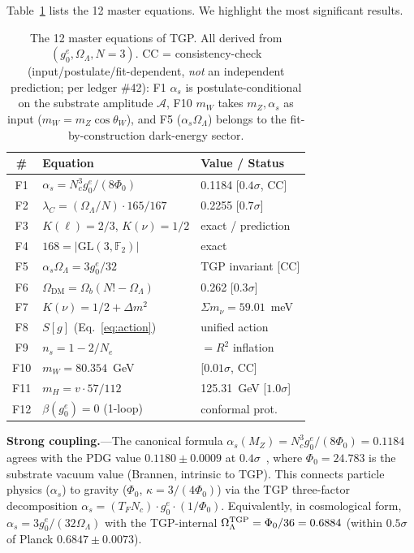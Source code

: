 \documentclass[aps,prl,twocolumn,superscriptaddress,showpacs,floatfix]{revtex4-2}
\newcommand{\gone}{{g_0^e}}
\newcommand{\OL}{\Omega_\Lambda}
\newcommand{\GL}{\mathrm{GL}(3,\mathbb{F}_2)}
\newcommand{\as}{\alpha_s}
\newcommand{\PhiZero}{\Phi_0}
\begin{document}
Table~\ref{tab:master} lists the 12 master equations.
We highlight the most significant results.

\begin{table}[b]
\caption{The 12 master equations of TGP.
  All derived from $(\gone, \OL, N{=}3)$.
  CC = consistency-check (input/postulate/fit-dependent, \emph{not} an
  independent prediction; per ledger \#42): F1 $\as$ is
  postulate-conditional on the substrate amplitude $\mathcal{A}$,
  F10 $m_W$ takes $m_Z,\as$ as input ($m_W=m_Z\cos\theta_W$), and
  F5 ($\as\OL$) belongs to the fit-by-construction dark-energy sector.}
\label{tab:master}
\begin{ruledtabular}
\begin{tabular}{cll}
\# & Equation & Value / Status \\
\hline
F1 & $\as = N_c^3\gone/(8\PhiZero)$ & 0.1184 [$0.4\sigma$, CC] \\
F2 & $\lambda_C = (\OL/N)\!\cdot\!165/167$ & 0.2255 [$0.7\sigma$] \\
F3 & $K(\ell) = 2/3$, $K(\nu) = 1/2$ & exact / prediction \\
F4 & $168 = |\GL|$ & exact \\
F5 & $\as\OL = 3\gone/32$ & TGP invariant [CC] \\
F6 & $\Omega_\mathrm{DM} = \Omega_b(N!{-}\OL)$ & 0.262 [$0.3\sigma$] \\
F7 & $K(\nu){=}1/2 + \Delta m^2$ & $\Sigma m_\nu = 59.01$~meV \\
F8 & $S[g]$ (Eq.~\ref{eq:action}) & unified action \\
F9 & $n_s = 1-2/N_e$ & $= R^2$ inflation \\
F10 & $m_W = 80.354$~GeV & [$0.01\sigma$, CC] \\
F11 & $m_H = v\cdot 57/112$ & 125.31~GeV [$1.0\sigma$] \\
F12 & $\beta(\gone) = 0$ (1-loop) & conformal prot. \\
\end{tabular}
\end{ruledtabular}
\end{table}


\textbf{Strong coupling.}---The canonical formula
$\as(M_Z) = N_c^3\gone/(8\PhiZero) = 0.1184$
agrees with the PDG value $0.1180 \pm 0.0009$ at $0.4\sigma$~\cite{PDG2024},
where $\PhiZero = 24.783$ is the substrate vacuum value (Brannen,
intrinsic to TGP).
This connects particle physics ($\as$) to gravity ($\PhiZero$,
$\kappa = 3/(4\PhiZero)$) via the TGP three-factor decomposition
$\as = (T_F N_c) \cdot \gone \cdot (1/\PhiZero)$.
Equivalently, in cosmological form, $\as = 3\gone/(32\OL)$ with
the TGP-internal $\OL^{\rm TGP} = \PhiZero/36 = 0.6884$
(within $0.5\sigma$ of Planck $0.6847 \pm 0.0073$).
\end{document}
